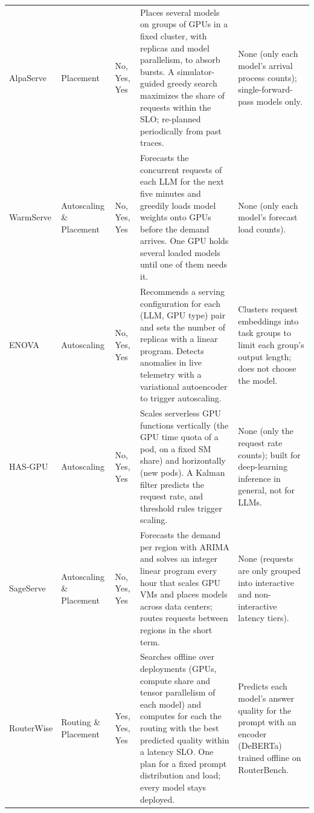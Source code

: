 \begin{landscape}
\begin{xltabular}{\linewidth}{p{1.75cm} p{1.55cm} p{1.3cm} X X}
AlpaServe \cite{alpaserve} & Placement & No, Yes, Yes & Places several models on groups of GPUs in a fixed cluster, with replicas and model parallelism, to absorb bursts. A simulator-guided greedy search maximizes the share of requests within the SLO; re-planned periodically from past traces. & None (only each model's arrival process counts); single-forward-pass models only. \\

WarmServe \cite{warmserve} & Autoscaling \newline \& Placement & No, Yes, Yes & Forecasts the concurrent requests of each LLM for the next five minutes and greedily loads model weights onto GPUs before the demand arrives. One GPU holds several loaded models until one of them needs it. & None (only each model's forecast load counts). \\

ENOVA \cite{enova} & Autoscaling & No, Yes, Yes & Recommends a serving configuration for each (LLM, GPU type) pair and sets the number of replicas with a linear program. Detects anomalies in live telemetry with a variational autoencoder to trigger autoscaling. & Clusters request embeddings into task groups to limit each group's output length; does not choose the model. \\

HAS-GPU \cite{hasgpu} & Autoscaling & No, Yes, Yes & Scales serverless GPU functions vertically (the GPU time quota of a pod, on a fixed SM share) and horizontally (new pods). A Kalman filter predicts the request rate, and threshold rules trigger scaling. & None (only the request rate counts); built for deep-learning inference in general, not for LLMs. \\

SageServe \cite{sageserve} & Autoscaling \newline \& Placement & No, Yes, Yes & Forecasts the demand per region with ARIMA and solves an integer linear program every hour that scales GPU VMs and places models across data centers; routes requests between regions in the short term. & None (requests are only grouped into interactive and non-interactive latency tiers). \\

RouterWise \cite{routerwise} & Routing \newline \& Placement & Yes, Yes, Yes & Searches offline over deployments (GPUs, compute share and tensor parallelism of each model) and computes for each the routing with the best predicted quality within a latency SLO. One plan for a fixed prompt distribution and load; every model stays deployed. & Predicts each model's answer quality for the prompt with an encoder (DeBERTa) trained offline on RouterBench. \\


\end{xltabular}
\end{landscape}
